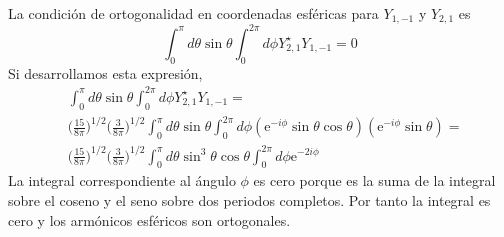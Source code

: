 \documentclass[addpoints,spanish, 12pt,a4paper]{exam}
\begin{document}
\begin{questions}
\begin{solution}
    La condición de ortogonalidad en coordenadas esféricas
    para $Y_{1,-1}$ y $Y_{2,1}$ es
    \begin{equation*}
        \int_0^\pi d\theta\sin\theta\int_0^{2\pi}d\phi Y_{2,1}^{\star}Y_{1,-1}=0
    \end{equation*}
    Si desarrollamos esta expresión,
    \begin{align*}
        &\int_0^\pi d\theta\sin\theta\int_0^{2\pi}d\phi Y_{2,1}^{\star}Y_{1,-1}=\\
        &\bigg(\frac{15}{8\pi}\bigg)^{1/2} \bigg(\frac{3}{8\pi}\bigg)^{1/2}
        \int_0^\pi d\theta\sin\theta
        \int_0^{2\pi}d\phi
        (\mathrm{e}^{-i\phi}\sin\theta\cos\theta)(\mathrm{e}^{-i\phi}\sin\theta)=\\
        &\bigg(\frac{15}{8\pi}\bigg)^{1/2} \bigg(\frac{3}{8\pi}\bigg)^{1/2}
           \int_0^\pi d\theta\sin^3\theta\cos\theta
           \int_0^{2\pi}d\phi \mathrm{e}^{-2i\phi}
    \end{align*}
   La integral correspondiente al ángulo $\phi$ es cero
   porque es la suma de la integral sobre el coseno y el 
   seno sobre dos periodos completos. Por tanto la 
   integral es cero y los armónicos esféricos son
   ortogonales.
    \end{solution}
    

\end{questions}
\end{document}

